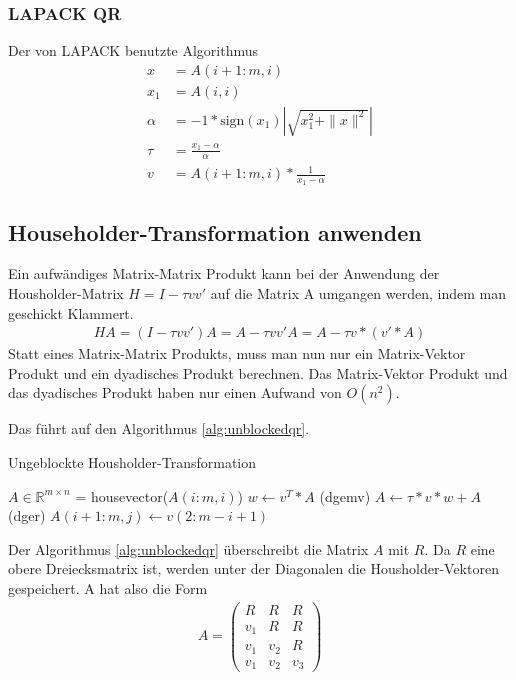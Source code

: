 \subsubsection{LAPACK QR}
Der von LAPACK benutzte Algorithmus \cite{DGEQR2}
\begin{align*}
x &= A(i+1:m,i)\\
x_1 &= A(i,i)\\
\alpha &= -1 * \text{sign}(x_1) \left|\sqrt{x_1^2 + \|x\|^2}\right|\\
\tau &= \frac{x_1 - \alpha}{\alpha} \\
v &= A(i+1:m,i) * \frac{1}{x_1 - \alpha}
\end{align*}



\subsection{Householder-Transformation anwenden}
Ein aufwändiges Matrix-Matrix Produkt kann bei der Anwendung der Housholder-Matrix $H = I - \tau vv'$ auf die Matrix A umgangen werden, indem man geschickt Klammert.
\begin{align*} 
H A =(I - \tau vv') A= A - \tau vv' A = A - \tau v*(v'*A)
\end{align*}
Statt eines Matrix-Matrix Produkts, muss man nun nur ein Matrix-Vektor Produkt und ein dyadisches Produkt berechnen.
Das Matrix-Vektor Produkt und das dyadisches Produkt haben nur einen Aufwand von $O(n^2)$.




Das führt auf den Algorithmus \ref{alg:unblockedqr}. 
\begin{algorithm}
	\caption{Ungeblockte Housholder-Transformation}
	\begin{algorithmic}
	\State $A \in \mathbb{R}^{m \times n}$
		\State [$v$, $\tau$] = housevector($A(i:m,i)$)
		\State $w \leftarrow v^T*A$ (dgemv)
		\State $ A \leftarrow \tau * v * w + A $ (dger)
			\State $A(i + 1 : m, j) \leftarrow v(2 : m - i + 1)$
		\EndIf
	\EndFor	
\end{algorithmic} 
\label{alg:unblockedqr}
\end{algorithm}



Der Algorithmus \ref{alg:unblockedqr} überschreibt die Matrix $A$ mit $R$. Da $R$ eine obere Dreiecksmatrix ist, werden unter der Diagonalen die Housholder-Vektoren gespeichert. A hat also die Form
\begin{align*}
	A = 
	\left(\begin{array}{ccc}
	R   &  R  & R \\ 
	v_1 &  R  & R \\ 
	v_1 & v_2 & R \\ 
	v_1 & v_2 & v_3
	\end{array} \right)
\end{align*}


